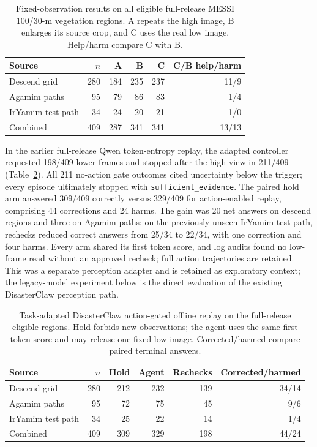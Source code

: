 \begin{table}[htbp]
\centering\small
\caption{Fixed-observation results on all eligible full-release MESSI 100/30-m vegetation regions. A repeats the high image, B enlarges its source crop, and C uses the real low image. Help/harm compare C with B.}
\label{tab:messi-full-fixed}
\begin{tabular}{lrrrrr}
\toprule
Source & $n$ & A & B & C & C/B help/harm\\
\midrule
Descend grid & 280 & 184 & 235 & 237 & 11/9\\
Agamim paths & 95 & 79 & 86 & 83 & 1/4\\
IrYamim test path & 34 & 24 & 20 & 21 & 1/0\\
Combined & 409 & 287 & 341 & 341 & 13/13\\
\bottomrule
\end{tabular}
\end{table}

In the earlier full-release Qwen token-entropy replay, the adapted controller requested 198/409 lower frames and stopped after the high view in 211/409 (Table~\ref{tab:messi-full-agent}). All 211 no-action gate outcomes cited uncertainty below the trigger; every episode ultimately stopped with \texttt{sufficient\_evidence}. The paired hold arm answered 309/409 correctly versus 329/409 for action-enabled replay, comprising 44 corrections and 24 harms. The gain was 20 net answers on descend regions and three on Agamim paths; on the previously unseen IrYamim test path, rechecks reduced correct answers from 25/34 to 22/34, with one correction and four harms. Every arm shared its first token score, and log audits found no low-frame read without an approved recheck; full action trajectories are retained. This was a separate perception adapter and is retained as exploratory context; the legacy-model experiment below is the direct evaluation of the existing DisasterClaw perception path.

\begin{table}[htbp]
\centering\small
\caption{Task-adapted DisasterClaw action-gated offline replay on the full-release eligible regions. Hold forbids new observations; the agent uses the same first token score and may release one fixed low image. Corrected/harmed compare paired terminal answers.}
\label{tab:messi-full-agent}
\begin{tabular}{lrrrrr}
\toprule
Source & $n$ & Hold & Agent & Rechecks & Corrected/harmed\\
\midrule
Descend grid & 280 & 212 & 232 & 139 & 34/14\\
Agamim paths & 95 & 72 & 75 & 45 & 9/6\\
IrYamim test path & 34 & 25 & 22 & 14 & 1/4\\
Combined & 409 & 309 & 329 & 198 & 44/24\\
\bottomrule
\end{tabular}
\end{table}


